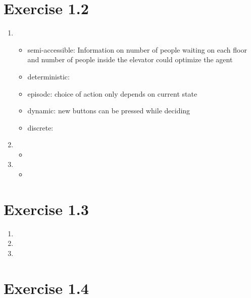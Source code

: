 \documentclass{article}
\begin{document}
\section*{Exercise 1.2}
\begin{enumerate}[label=(\alph*)]
	\item	\begin{itemize}
				\item	semi-accessible: Information on number of people waiting on each floor and number of people inside the elevator could optimize the agent
				\item	deterministic:
				\item	episodc: choice of action only depends on current state
				\item	dynamic: new buttons can be pressed while deciding
				\item	discrete:
			\end{itemize}
	\item	\begin{itemize}
				\item
			\end{itemize}
	\item	\begin{itemize}
				\item
			\end{itemize}
\end{enumerate}

\section*{Exercise 1.3}
\begin{enumerate}[label=(\alph*)]
	\item
	\item
	\item
\end{enumerate}

\section*{Exercise 1.4}
\end{document}
